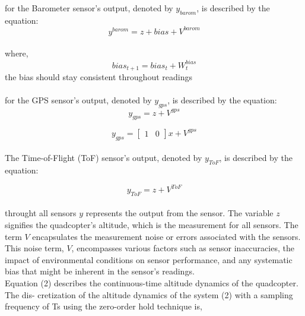 \documentclass{article}
\begin{document}
\noindent
for the Barometer sensor's output, denoted by \( y_{barom} \), is described by the equation:
\begin{equation}
y^{barom} = z + bias + V^{barom}
\end{equation}
\\
where, 
\begin{equation}
bias_{t+1} = bias_t + W_{t}^{bias}
\end{equation}
the bias should stay consistent throughout readings 
\\
\\ 


\noindent
for the GPS sensor's output, denoted by \( y_{gps} \), is described by the equation:
\begin{equation}
y_{gps} = z + V^{gps}
\end{equation}

\begin{equation}
y_{gps} =
\begin{bmatrix}
    1 & 0
\end{bmatrix}
x + V^{gps}
\end{equation}
\\

\noindent
The Time-of-Flight (ToF) sensor's output, denoted by \( y_{ToF} \), is described by the equation:

\begin{equation}
y_{ToF} = z + V^{ToF}
\end{equation}
\\

\noindent
throught all sensors \( y \) represents the output from the sensor. The variable \( z \) signifies the quadcopter's altitude, which is the measurement for all sensors. The term \( V \) encapsulates the measurement noise or errors associated with the sensors. This noise term, \( V \), encompasses various factors such as sensor inaccuracies, the impact of environmental conditions on sensor performance, and any systematic bias that might be inherent in the sensor's readings.
\\

\noindent
Equation (2) describes the continuous-time altitude dynamics of the quadcopter. The dis-
cretization of the altitude dynamics of the system (2) with a sampling frequency of Ts using the zero-order hold technique is,
\end{document}
